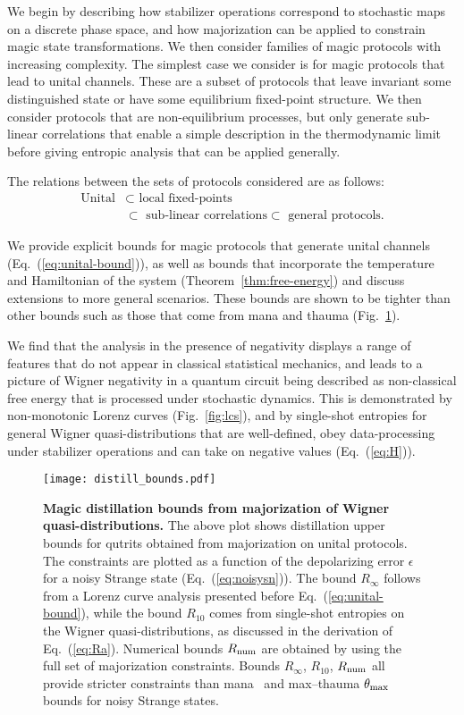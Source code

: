 \documentclass[
onecolumn,
superscriptaddress
]{revtex4-1}
\begin{document}
We begin by describing how stabilizer operations correspond to stochastic maps on a discrete phase space, and how majorization can be applied to constrain magic state transformations. We then consider families of magic protocols with increasing complexity. The simplest case we consider is for magic protocols that lead to unital channels. These are a subset of protocols that leave invariant some distinguished state or have some equilibrium fixed-point structure. We then consider protocols that are non-equilibrium processes, but only generate sub-linear correlations that enable a simple description in the thermodynamic limit before giving entropic analysis that can be applied generally.

The relations between the sets of protocols considered are as follows:
\begin{align}
	\mbox{Unital} &\subset \mbox{ local fixed-points} \nonumber\\ 
&\subset \mbox{ sub-linear correlations} \subset \mbox{ general protocols.} \nonumber
\end{align}

We provide explicit bounds for magic protocols that generate unital channels (Eq.~(\ref{eq:unital-bound})), as well as bounds that incorporate the temperature and Hamiltonian of the system (Theorem~\ref{thm:free-energy}) and discuss extensions to more general scenarios. These bounds are shown to be tighter than other bounds such as those that come from mana and thauma (Fig.~\ref{fig:distill_bounds}). 

We find that the analysis in the presence of negativity displays a range of features that do not appear in classical statistical mechanics, and leads to a picture of Wigner negativity in a quantum circuit being described as non-classical free energy that is processed under stochastic dynamics. This is demonstrated by non-monotonic Lorenz curves (Fig.~\ref{fig:lcs}), and by single-shot entropies for general Wigner quasi-distributions that are well-defined, obey data-processing under stabilizer operations and can take on negative values (Eq.~(\ref{eq:H})).

\begin{figure}[t]
    \centering
    \texttt{[image: distill\_bounds.pdf]}
    \caption{\textbf{Magic distillation bounds from majorization of Wigner quasi-distributions.} The above plot shows distillation upper bounds for qutrits obtained from majorization on unital protocols. The constraints are plotted as a function of the depolarizing error $\epsilon$ for a noisy Strange state (Eq.~(\ref{eq:noisysn})). The bound $R_\infty$ follows from a Lorenz curve analysis presented before Eq.~(\ref{eq:unital-bound}), while the bound $R_{10}$ comes from single-shot entropies on the Wigner quasi-distributions, as discussed in the derivation of Eq.~(\ref{eq:Ra}). Numerical bounds $R_{\rm{num}}$ are obtained by using the full set of majorization constraints. Bounds $R_\infty$, $R_{10}$, $R_{\rm{num}}$ all provide stricter constraints than mana~\cite{cit:veitch2} and max--thauma $\theta_{\rm{max}}$~\cite{Wang_2020} bounds for noisy Strange states.
    }
    \label{fig:distill_bounds}
\end{figure}
\end{document}
